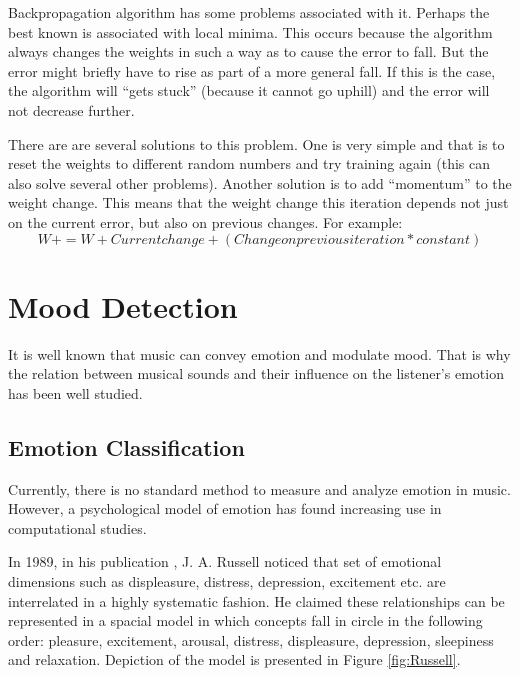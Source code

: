Backpropagation algorithm has some problems associated with it. Perhaps the best known is associated with local minima. This occurs because the algorithm always changes the weights in such a way as to cause the error to fall. But the error might briefly have to rise as part of a more general fall. If this is the case, the algorithm will ``gets stuck'' (because it cannot go uphill) and the error will not decrease further.

There are are several solutions to this problem. One is very simple and that is to reset the weights to different random numbers and try training again (this can also solve several other problems). Another solution is to add ``momentum'' to the weight change. This means that the weight change this iteration depends not just on the current error, but also on previous changes. For example: 
\begin{equation}
W+ = W + Current change + (Change on previous iteration * constant)
\end{equation}

\vspace{20pt}


\section{Mood Detection}


It is well known that music can convey emotion and modulate mood. That is why the relation between musical sounds and their influence on the listener’s emotion has been well studied.

\subsection{Emotion Classification}
\label{sec:emotionClass}

Currently, there is no standard method to measure and analyze emotion in music. However, a psychological model of emotion has found increasing use in computational studies. 

In 1989, in his publication \cite{Russell}, J. A. Russell noticed that set of emotional dimensions such as displeasure, distress, depression, excitement etc. are interrelated in a highly systematic fashion. He claimed these relationships can be represented in a spacial model in which concepts fall in circle in the following order: pleasure, excitement, arousal, distress, displeasure, depression, sleepiness and relaxation. Depiction of the model is presented in Figure \ref{fig:Russell}.

